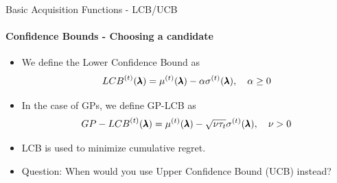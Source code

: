\begin{frame}[c]{Basic Acquisition Functions - LCB/UCB}
\framesubtitle{Confidence Bounds - Choosing a candidate}
\pause
\begin{itemize}
    \item<+->{We define the Lower Confidence Bound as 
    \[{LCB}^{(t)}(\pmb{\lambda}) = {\mu}^{(t)}(\pmb{\lambda}) - \alpha{\sigma}^{(t)}(\pmb{\lambda}),\quad\alpha\geq0\]}
    \item<+->{In the case of GPs, we define GP-LCB as
    \[{GP-LCB}^{(t)}(\pmb{\lambda}) = {\mu}^{(t)}(\pmb{\lambda}) - \sqrt{\nu\tau_t}{\sigma}^{(t)}(\pmb{\lambda}), \quad\nu>0\]}
    \item<+->{LCB is used to minimize cumulative regret.} 
    \item<+->{Question: When would you use Upper Confidence Bound (UCB) instead?}
\end{itemize}
\end{frame}
